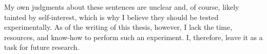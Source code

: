\documentclass[MilwayThesis]{subfiles}
\begin{document}
My own judgments about these sentences are unclear and, of course, likely tainted by self-interest, which is why I believe they should be tested experimentally.
As of the writing of this thesis, however, I lack the time, resources, and know-how to perform such an experiment.
I, therefore, leave it as a task for future research.
\end{document}
